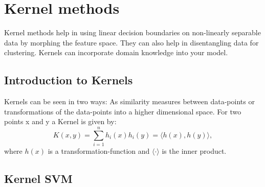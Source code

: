 \documentclass[main.tex]{subfiles}
\begin{document}
\section{Kernel methods}
Kernel methods help in using linear decision boundaries on non-linearly separable data by morphing the feature space. They can also help in disentangling data for clustering. Kernels can incorporate domain knowledge into your model.

\subsection{Introduction to Kernels}
Kernels can be seen in two ways: As similarity measures between data-points or transformations of the data-points into a higher dimensional space. 
For two points x and y a Kernel is given by:
\begin{equation}
    K(x,y) = \sum_{i=1}^n h_i(x) h_i(y) = \langle {h(x),h(y)} \rangle,
\end{equation}
where $h(x)$ is a transformation-function and $\langle \cdot \rangle$ is the inner product. 

\subsection{Kernel SVM}
\end{document}
